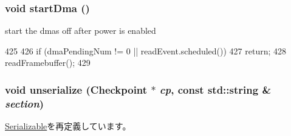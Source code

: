 \hypertarget{classPl111_a3c48da42be160d9646d69fad61037078}{
\subsubsection[{startDma}]{\setlength{\rightskip}{0pt plus 5cm}void startDma ()}}
\label{classPl111_a3c48da42be160d9646d69fad61037078}
start the dmas off after power is enabled 


\begin{DoxyCode}
425 {
426     if (dmaPendingNum != 0 || readEvent.scheduled())
427         return;
428     readFramebuffer();
429 }
\end{DoxyCode}
\hypertarget{classPl111_af22e5d6d660b97db37003ac61ac4ee49}{
\subsubsection[{unserialize}]{\setlength{\rightskip}{0pt plus 5cm}void unserialize ({\bf Checkpoint} $\ast$ {\em cp}, \/  const std::string \& {\em section})}}
\label{classPl111_af22e5d6d660b97db37003ac61ac4ee49}


\hyperlink{classSerializable_af100c4e9feabf3cd918619c88c718387}{Serializable}を再定義しています。


